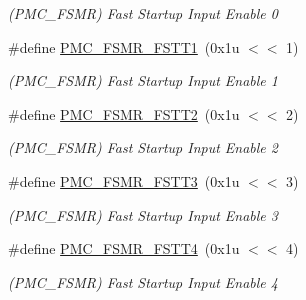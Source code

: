 \begin{DoxyCompactItemize}
\begin{DoxyCompactList}\small\item\em (P\+M\+C\+\_\+\+F\+S\+MR) Fast Startup Input Enable 0 \end{DoxyCompactList}\item 
\mbox{\label{group__SAMS70__PMC_ga9ea2a7647ca3147fd349b666b3da4a3a}} 
\#define \mbox{\hyperlink{group__SAMS70__PMC_ga9ea2a7647ca3147fd349b666b3da4a3a}{P\+M\+C\+\_\+\+F\+S\+M\+R\+\_\+\+F\+S\+T\+T1}}~(0x1u $<$$<$ 1)
\begin{DoxyCompactList}\small\item\em (P\+M\+C\+\_\+\+F\+S\+MR) Fast Startup Input Enable 1 \end{DoxyCompactList}\item 
\mbox{\label{group__SAMS70__PMC_gabfc48683196af6e41928ef97958820bc}} 
\#define \mbox{\hyperlink{group__SAMS70__PMC_gabfc48683196af6e41928ef97958820bc}{P\+M\+C\+\_\+\+F\+S\+M\+R\+\_\+\+F\+S\+T\+T2}}~(0x1u $<$$<$ 2)
\begin{DoxyCompactList}\small\item\em (P\+M\+C\+\_\+\+F\+S\+MR) Fast Startup Input Enable 2 \end{DoxyCompactList}\item 
\mbox{\label{group__SAMS70__PMC_ga209ebf830fe0d38dec72a4157c8c0285}} 
\#define \mbox{\hyperlink{group__SAMS70__PMC_ga209ebf830fe0d38dec72a4157c8c0285}{P\+M\+C\+\_\+\+F\+S\+M\+R\+\_\+\+F\+S\+T\+T3}}~(0x1u $<$$<$ 3)
\begin{DoxyCompactList}\small\item\em (P\+M\+C\+\_\+\+F\+S\+MR) Fast Startup Input Enable 3 \end{DoxyCompactList}\item 
\mbox{\label{group__SAMS70__PMC_ga6ca1b1aa6cc30dfe611abc2f68c1225f}} 
\#define \mbox{\hyperlink{group__SAMS70__PMC_ga6ca1b1aa6cc30dfe611abc2f68c1225f}{P\+M\+C\+\_\+\+F\+S\+M\+R\+\_\+\+F\+S\+T\+T4}}~(0x1u $<$$<$ 4)
\begin{DoxyCompactList}\small\item\em (P\+M\+C\+\_\+\+F\+S\+MR) Fast Startup Input Enable 4 \end{DoxyCompactList}\item 
\mbox{\label{group__SAMS70__PMC_ga9bac35f07a6ff0faaf033f61b161f936}} 

\end{DoxyCompactItemize}
